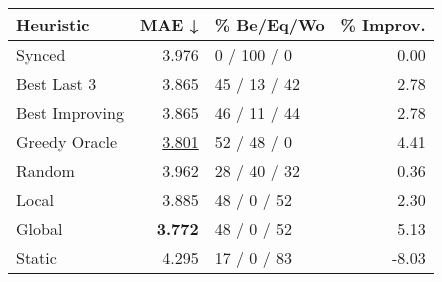 \begin{tabular}{lrlr}
\toprule
\textbf{Heuristic} & \textbf{MAE ↓} & \textbf{\% Be/Eq/Wo} & \textbf{\% Improv.} \\
\midrule
            Synced &          3.976 &          0 / 100 / 0 &                0.00 \\
\midrule
       Best Last 3 &          3.865 &         45 / 13 / 42 &                2.78 \\
    Best Improving &          3.865 &         46 / 11 / 44 &                2.78 \\
\addlinespace
     Greedy Oracle &          \underline{3.801} &          52 / 48 / 0 &                4.41 \\
            Random &          3.962 &         28 / 40 / 32 &                0.36 \\
\midrule
             Local &          3.885 &          48 / 0 / 52 &                2.30 \\
            Global &          \textbf{3.772} &          48 / 0 / 52 &                5.13 \\
\midrule
            Static &          4.295 &          17 / 0 / 83 &               -8.03 \\
\bottomrule
\end{tabular}

\label{tab:ds_iid_lr05_le2_bs4_Summary}
